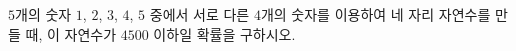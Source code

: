 $5$개의 숫자 $1$, $2$, $3$, $4$, $5$ 중에서 서로 다른 $4$개의 숫자를 이용하여 네 자리 자연수를 만들 때, 이 자연수가 $4500$ 이하일 확률을 구하시오.
